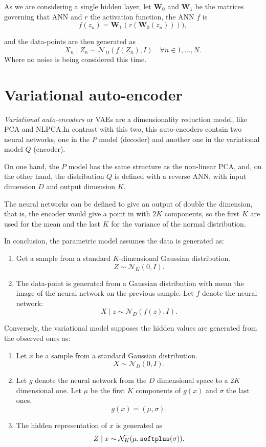 As we are considering a single hidden layer, let \(\bm{W}_{0}\) and \(\bm{W}_{1}\) be the matrices governing that ANN and \(r\) the activation function, the ANN \(f\) is
\[
  f(z_{n}) = \bm{W_{1}}(r(\bm{W}_{0}(z_{n})))),
\]

and the data-points are then generated as
\[
  X_{n}\mid Z_{n} \sim \mathcal{N}_{D}(f(Z_{n}), I) \quad \forall n \in 1,\dots,N.
\]
Where no noise is being considered this time.

\section{Variational auto-encoder}\label{sec:vae}

\emph{Variational auto-encoders} or VAEs are a dimensionality reduction model, like PCA and NLPCA.\@ In contrast with this two, this auto-encoders contain two neural networks, one in the \(P\) model (decoder) and another one in the variational model \(Q\) (encoder).

On one hand, the \(P\) model has the same structure as the non-linear PCA, and, on the other hand, the  distribution \(Q\) is defined with a reverse ANN, with input dimension \(D\) and output dimension \(K\).

The neural networks can be defined to give an output of double the dimension, that is, the encoder would give a point in with \( 2K \) components, so the first \( K \) are used for the mean and the last \( K \) for the variance of the normal distribution.

In conclusion, the parametric model assumes the data is generated as:
\begin{enumerate}
  \item Get a sample from a standard \(K\)-dimensional Gaussian distribution.
    \[
    Z \sim \mathcal{N}_{K}(0,I).
    \]
  \item The data-point is generated from a Gaussian distribution with mean the image of the neural network on the previous sample. Let \(f\) denote the neural network:
    \[
    X \mid z \sim \mathcal{N}_{D}(f(z), I).
    \]
\end{enumerate}
Conversely, the variational model supposes the hidden values are generated from the observed ones as:
\begin{enumerate}
  \item Let \(x\) be a sample from a standard Gaussian distribution.
    \[
    X \sim \mathcal{N}_{D}(0,I).
    \]
  \item Let \(g\) denote the neural network from the \(D\) dimensional space to a \(2K\) dimensional one. Let \(\mu\) be the first \(K\) components of \(g(x)\) and \(\sigma\) the last ones.
    \[
    g(x) = (\mu, \sigma).
    \]
  \item The hidden representation of \(x\) is generated as
    \[
    Z \mid x \sim \mathcal{N}_{K}(\mu, \text{\texttt{softplus}}(\sigma)).
    \]
\end{enumerate}

